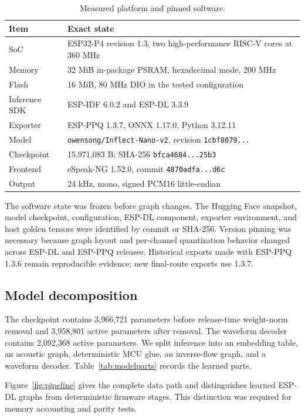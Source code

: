 \documentclass[10pt]{article}
\begin{document}
\begin{table}[t]
\centering
\caption{Measured platform and pinned software.}
\label{tab:platform}
\small
\begin{tabularx}{\linewidth}{@{}lY@{}}
\toprule
Item & Exact state \\
\midrule
SoC & ESP32-P4 revision 1.3, two high-performance RISC-V cores at 360 MHz \\
Memory & 32 MiB in-package PSRAM, hexadecimal mode, 200 MHz \\
Flash & 16 MiB, 80 MHz DIO in the tested configuration \\
Inference SDK & ESP-IDF 6.0.2 and ESP-DL 3.3.9 \\
Exporter & ESP-PPQ 1.3.7, ONNX 1.17.0, Python 3.12.11 \\
Model & \texttt{owensong/Inflect-Nano-v2}, revision \texttt{1cbf8079...} \\
Checkpoint & 15,971,083 B; SHA-256 \texttt{bfca4684...25b3} \\
Frontend & eSpeak-NG 1.52.0, commit \texttt{4870adfa...d6c} \\
Output & 24 kHz, mono, signed PCM16 little-endian \\
\bottomrule
\end{tabularx}
\end{table}

The software state was frozen before graph changes. The Hugging Face snapshot,
model checkpoint, configuration, ESP-DL component, exporter environment, and
host golden tensors were identified by commit or SHA-256. Version pinning was
necessary because graph layout and per-channel quantization behavior changed
across ESP-DL and ESP-PPQ releases. Historical exports made with ESP-PPQ 1.3.6
remain reproducible evidence; new final-route exports use 1.3.7.

\subsection{Model decomposition}

The checkpoint contains 3,966,721 parameters before release-time weight-norm
removal and 3,958,801 active parameters after removal. The waveform decoder
contains 2,092,368 active parameters. We split inference into an embedding
table, an acoustic graph, deterministic MCU glue, an inverse-flow graph, and
a waveform decoder. Table~\ref{tab:modelparts} records the learned parts.

Figure~\ref{fig:pipeline} gives the complete data path and distinguishes
learned ESP-DL graphs from deterministic firmware stages. This distinction
was required for memory accounting and parity tests.
\end{document}
